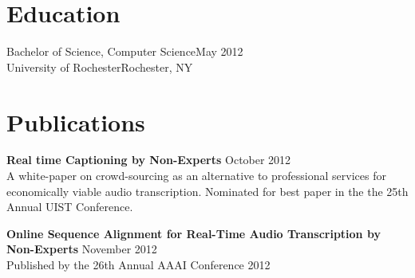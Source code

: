 \section{Education}

  Bachelor of Science, Computer Science\hfill May 2012\\
  University of Rochester\hfill Rochester, NY\\

\section{Publications}
  \begin{flushleft}

    \textbf{Real time Captioning by Non-Experts} \hfill October  2012\\
    A white-paper on crowd-sourcing as an alternative to professional services for economically viable audio transcription. Nominated for best paper in the the 25th Annual UIST Conference.
    \vspace{10pt}    
    
    
    \textbf{Online Sequence Alignment for Real-Time Audio Transcription by Non-Experts} \hfill November 2012\\
    Published by the 26th Annual AAAI Conference 2012
  \end{flushleft}



